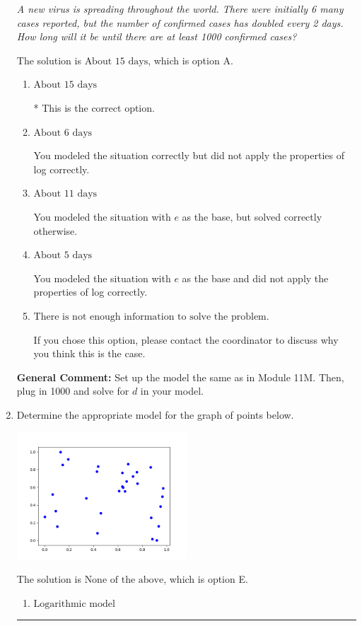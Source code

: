 \documentclass{extbook}[14pt]
\newcommand{\litem}[1]{\item #1

\rule{\textwidth}{0.4pt}}
\begin{document}
\begin{enumerate}
{\begin{center}
    \textit{ A new virus is spreading throughout the world. There were initially 6 many cases reported, but the number of confirmed cases has doubled every 2 days. How long will it be until there are at least 1000 confirmed cases? }
\end{center}
The solution is \( \text{About } 15 \text{ days} \), which is option A.\begin{enumerate}[label=\Alph*.]
\item \( \text{About } 15 \text{ days} \)

* This is the correct option.
\item \( \text{About } 6 \text{ days} \)

You modeled the situation correctly but did not apply the properties of log correctly.
\item \( \text{About } 11 \text{ days} \)

You modeled the situation with $e$ as the base, but solved correctly otherwise.
\item \( \text{About } 5 \text{ days} \)

You modeled the situation with $e$ as the base and did not apply the properties of log correctly.
\item \( \text{There is not enough information to solve the problem.} \)

If you chose this option, please contact the coordinator to discuss why you think this is the case.
\end{enumerate}

\textbf{General Comment:} Set up the model the same as in Module 11M. Then, plug in 1000 and solve for $d$ in your model.
}
\litem{
Determine the appropriate model for the graph of points below.

\begin{center}
    \includegraphics[width=0.5\textwidth]{../Figures/identifyModelGraph12CopyB.png}
\end{center}


The solution is \( \text{None of the above} \), which is option E.\begin{enumerate}[label=\Alph*.]
\item \( \text{Logarithmic model} \)


\end{enumerate}}
\end{enumerate}
\end{document}
